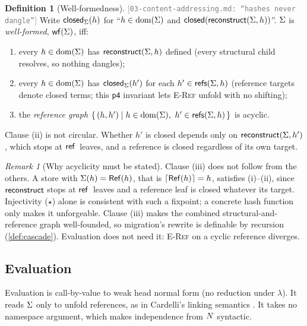 \documentclass[11pt]{article}
\theoremstyle{definition}
\newtheorem{definition}{Definition}[section]
\theoremstyle{plain}
\theoremstyle{remark}
\newtheorem{remark}{Remark}[section]
\newcommand{\src}[1]{{\footnotesize\textcolor{gray}{[\texttt{#1}]}}}
\begin{document}
\begin{definition}[Well-formedness]\label{def:wf}
\src{03-content-addressing.md: ``hashes never dangle''} Write $\mathsf{closed}_{\Sigma}(h)$ for
``$h \in \operatorname{dom}(\Sigma)$ and $\mathsf{closed}(\mathsf{reconstruct}(\Sigma,h))$''. $\Sigma$ is
\emph{well-formed}, $\mathsf{wf}(\Sigma)$, iff:
\begin{enumerate}[nosep,label=(\roman*)]
  \item every $h \in \operatorname{dom}(\Sigma)$ has $\mathsf{reconstruct}(\Sigma,h)$ defined (every structural child
  resolves, so nothing dangles);
  \item every $h \in \operatorname{dom}(\Sigma)$ has $\mathsf{closed}_{\Sigma}(h')$ for each
  $h' \in \mathsf{refs}(\Sigma,h)$ (reference targets denote closed terms; this \texttt{p4} invariant
  lets \textsc{E-Ref} unfold with no shifting);
  \item the \emph{reference graph}
  $\{\,(h,h') \mid h \in \operatorname{dom}(\Sigma),\ h' \in \mathsf{refs}(\Sigma,h)\,\}$ is acyclic.
\end{enumerate}
Clause (ii) is not circular. Whether $h'$ is closed depends only on
$\mathsf{reconstruct}(\Sigma,h')$, which stops at $\mathsf{ref}\,$ leaves, and a reference is closed
regardless of its own target.
\end{definition}

\begin{remark}[Why acyclicity must be stated]\label{rem:acyclic}
Clause (iii) does not follow from the others. A store with $\Sigma(h) = \mathsf{Ref}(h)$, that is
$\lceil \mathsf{Ref}(h) \rceil = h$, satisfies (i)--(ii), since $\mathsf{reconstruct}$ stops at $\mathsf{ref}\,$ leaves
and a reference leaf is closed whatever its target. Injectivity ($\star$) alone is consistent
with such a fixpoint; a concrete hash function only makes it unforgeable. Clause (iii) makes
the combined structural-and-reference graph well-founded, so migration's rewrite is definable
by recursion (\cref{def:cascade}). Evaluation does not need it: \textsc{E-Ref} on a cyclic
reference diverges.
\end{remark}

\subsection{Evaluation}

Evaluation is call-by-value to weak head normal form (no reduction under $\lambda$). It reads
$\Sigma$ only to unfold references, as in Cardelli's linking semantics
\cite{Cardelli1997Linking}. It takes no namespace argument, which makes independence from
$N$ syntactic.
\end{document}
